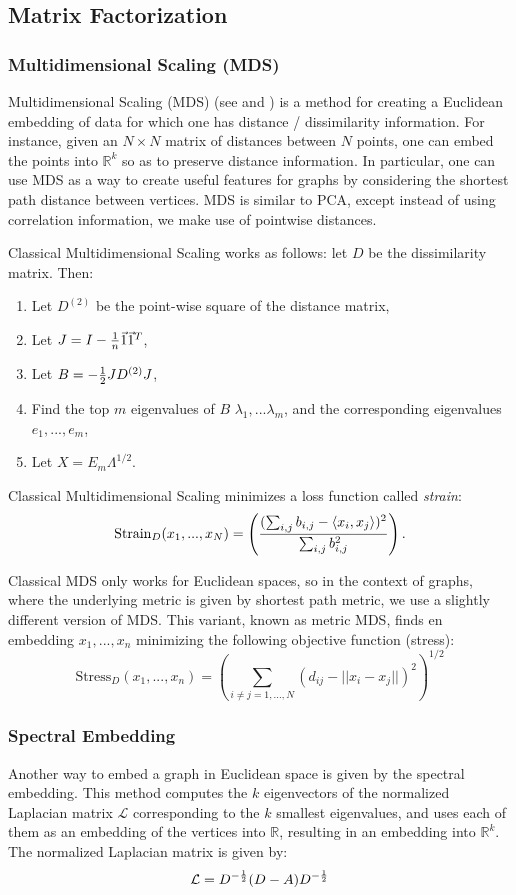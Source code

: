 \subsection{Matrix Factorization}
\subsubsection*{Multidimensional Scaling (MDS)}
Multidimensional Scaling (MDS) (see \cite{cox2000multidimensional} and \cite{borg2003modern}) is a method for creating a Euclidean embedding of data for which one has distance / dissimilarity information. For instance, given an $N \times N$ matrix of distances between $N$ points, one can embed the points into $\mathbb{R}^k$ so as to preserve distance information. In particular, one can use MDS as a way to create useful features for graphs by considering the shortest path distance between vertices. MDS is similar to PCA, except instead of using correlation information, we make use of pointwise distances.

Classical Multidimensional Scaling works as follows: let $D$ be the dissimilarity matrix. Then:
\begin{enumerate}
  \item Let $D^{(2)}$ be the point-wise square of the distance matrix,
  \item Let $J = I - {1\over n}\vec{1}\vec{1}^T$,
  \item Let $B = -{1 \over 2}JD^{(2)}J$,
  \item Find the top $m$ eigenvalues of $B$ $\lambda_1, ... \lambda_m$, and the corresponding eigenvalues $e_1, ... , e_m$,
  \item Let $X = E_m\Lambda^{1/2}$.
\end{enumerate}

Classical Multidimensional Scaling minimizes a loss function called \emph{strain}:
\[
    \text{Strain}_D(x_1, ... , x_N) = \left( ({\sum_{i,j}b_{i,j}- \langle x_i,x_j \rangle})^2 \over \sum_{i,j}b_{i,j}^2\right).
\]

Classical MDS only works for Euclidean spaces, so in the context of graphs, where the underlying metric is given by shortest path metric, we use a slightly different version of MDS. This variant, known as metric MDS, finds en embedding $x_1, ... , x_n$ minimizing the following objective function (stress):
\[
    \text{Stress}_D(x_1, ... , x_n) = \left(\sum_{i \neq j = 1, ... ,N}(d_{ij} - ||x_i - x_j||)^2\right)^{1/2}
\]



\subsubsection*{Spectral Embedding}
Another way to embed a graph in Euclidean space is given by the spectral embedding. This method computes the $k$ eigenvectors of the normalized Laplacian matrix $\mathcal{L}$  corresponding to the $k$ smallest eigenvalues, and uses each of them as an embedding of the  vertices into $\mathbb{R}$, resulting in an  embedding into $\mathbb{R}^k$. The normalized Laplacian matrix is given by:
\[
    \mathcal{L} = D^{-{1\over 2}}(D - A)D^{-{1\over 2}}
\]

